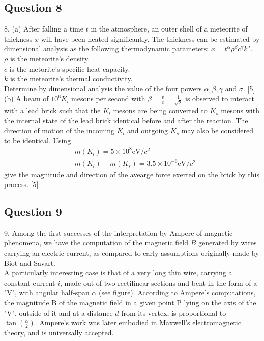 \documentclass{article}
\begin{document}
\subsection{Question 8}
8. (a) After falling a time $t$ in the atmosphere, an outer shell of a meteorite of thickness $x$ will have been heated significantly. The thickness can be estimated by dimensional analysis as the following thermodynamic parameters: $x=t^{\alpha} \rho^{\beta} c^{\gamma} k^{\sigma}$. \\
$\rho$ is the meteorite's density. \\
$c$ is the metorite's specific heat capacity. \\
$k$ is the meteorite's thermal conductivity. \\
Determine by dimensional analysis the value of the four powers $\alpha, \beta, \gamma$ and $\sigma$. [5] \\
(b) A beam of $10^{6} K_{l}$ mesons per second with $\beta=\frac{v}{c}=\frac{1}{\sqrt{2}}$ is observed to interact with a lead brick such that the $K_{l}$ mesons are being converted to $K_{s}$ mesons with the internal state of the lead brick identical before and after the reaction. The direction of motion of the incoming $K_{l}$ and outgoing $K_{s}$ may also be considered to be identical. Using
$$
\begin{aligned}
	&m\left(K_{l}\right)=5 \times 10^{8} \mathrm{eV} / c^{2} \\
	&m\left(K_{l}\right)-m\left(K_{s}\right)=3.5 \times 10^{-6} \mathrm{eV} / c^{2}
\end{aligned}
$$
give the magnitude and direction of the avearge force exerted on the brick by this process. [5] 

\subsection{Question 9}
9. Among the first successes of the interpretation by Ampere of magnetic phenomena, we have the computation of the magnetic field $B$ generated by wires carrying an electric current, as compared to early assumptions originally made by Biot and Savart. \\
A particularly interesting case is that of a very long thin wire, carrying a constant current $i$, made out of two rectilinear sections and bent in the form of a "V", with angular half-span $\alpha$ (see figure). According to Ampere's computations, the magnitude $\mathrm{B}$ of the magnetic field in a given point $\mathrm{P}$ lying on the axis of the "V", outside of it and at a distance $d$ from its vertex, is proportional to $\tan \left(\frac{\alpha}{2}\right) .$ Ampere's work was later embodied in Maxwell's electromagnetic theory, and is universally accepted. 
\end{document}
